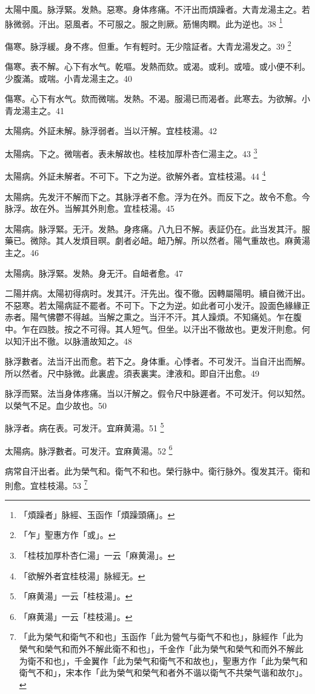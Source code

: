 \documentclass[b5paper,twoside,zihao=-4,UTF8]{ctexbook}
\begin{document}
太陽中風。脉浮緊。发熱。惡寒。身{体}疼痛。不汗出而煩躁者。大青龙湯主之。若脉微弱。汗出。惡風者。不可服之。服之則厥。筋愓肉瞤。此为逆也。38
	\footnote{「煩躁者」脉經、玉函作「煩躁頭痛」。}

傷寒。脉浮緩。身不疼。但重。乍有輕时。无少陰証者。大青龙湯发之。39
	\footnote{「乍」聖惠方作「或」。}

傷寒。表不解。心下有水气。乾嘔。发熱而欬。或渴。或利。或噎。或小便不利。少腹滿。或喘。小青龙湯主之。40

傷寒。心下有水气。欬而微喘。发熱。不渴。服湯已而渴者。此寒去。为欲解。小青龙湯主之。41

太陽病。外証未解。脉浮弱者。当以汗解。宜桂枝湯。42

太陽病。下之。微喘者。表未解故也。桂枝{加厚朴杏仁}湯主之。43
	\footnote{「桂枝加厚朴杏仁湯」一云「麻黄湯」。}

太陽病。外証未解者。不可下。下之为逆。欲解外者。宜桂枝湯。44
	\footnote{「欲解外者宜桂枝湯」脉經无。}

太陽病。先发汗不解而下之。其脉浮者不愈。浮为在外。而反下之。故令不愈。今脉浮。故在外。当解其外則愈。宜桂枝湯。45

太陽病。脉浮緊。无汗。发熱。身疼痛。八九日不解。表証仍在。此当发其汗。服藥已。微除。其人发煩目暝。劇者必衄。衄乃解。所以然者。陽气重故也。麻黄湯主之。46

太陽病。脉浮緊。发熱。身无汗。自衄者愈。47

二陽并病。太陽初得病时。发其汗。汗先出{。復}不徹。因轉屬陽明。續自微汗出。不惡寒。若太陽病証不罷者。不可下。下之为逆。如此者可小发汗。設面色緣緣正赤者。陽气怫鬱不得越。当解之熏之。当汗不汗。其人躁煩。不知痛処。乍在腹中。乍在四肢。按之不可得。其人短气。但坐。以汗出不徹故也。更发汗則愈。何以知汗出不徹。以脉濇故知之。48

脉浮數者。法当汗出而愈。若下之。身体重。心悸者。不可发汗。当自汗出而解。所以然者。尺中脉微。此裏虗。須表裏実。津液和。即自汗出愈。49

脉浮而緊。法当身体疼痛。当以汗解之。假令尺中脉遲者。不可发汗。何以知然。以榮气不足。血少故也。50

脉浮者。病在表。可发汗。宜麻黄湯。51
	\footnote{「麻黄湯」一云「桂枝湯」。}

{太陽病。}脉浮數者。可发汗。宜麻黄湯。52
	\footnote{「麻黄湯」一云「桂枝湯」。}

病常自汗出者。此为榮气和。衛气不和也。榮行脉中。衛行脉外。復发其汗。衛和則愈。宜桂枝湯。53
	\footnote{「此为榮气和衛气不和也」玉函作「此为營气与衛气不和也」，脉經作「此为榮气和榮气和而外不解此衛不和也」，千金作「此为榮气和榮气和而外不解此为衛不和也」，千金翼作「此为榮气和衛气不和故也」，聖惠方作「此为榮气和衛气不和」，宋本作「此为榮气和榮气和者外不谐以衛气不共榮气谐和故尔」。}
\end{document}
